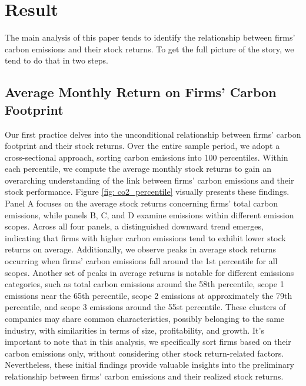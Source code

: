 \documentclass[12pt]{article}
\begin{document}
\section{Result} \label{sec:result}

The main analysis of this paper tends to identify the relationship between firms' carbon emissions and their stock returns. To get the full picture of the story, we tend to do that in two steps. 
\subsection{Average Monthly Return on Firms' Carbon Footprint}

Our first practice delves into the unconditional relationship between firms' carbon footprint and their stock returns. Over the entire sample period, we adopt a cross-sectional approach, sorting carbon emissions into 100 percentiles. Within each percentile, we compute the average monthly stock returns to gain an overarching understanding of the link between firms' carbon emissions and their stock performance. Figure \ref{fig: co2_percentile} visually presents these findings. Panel A focuses on the average stock returns concerning firms' total carbon emissions, while panels B, C, and D examine emissions within different emission scopes. Across all four panels, a distinguished downward trend emerges, indicating that firms with higher carbon emissions tend to exhibit lower stock returns on average. Additionally, we observe peaks in average stock returns occurring when firms' carbon emissions fall around the 1st percentile for all scopes. Another set of peaks in average returns is notable for different emissions categories, such as total carbon emissions around the 58th percentile, scope 1 emissions near the 65th percentile, scope 2 emissions at approximately the 79th percentile, and scope 3 emissions around the 55st percentile. These clusters of companies may share common characteristics, possibly belonging to the same industry, with similarities in terms of size, profitability, and growth. It's important to note that in this analysis, we specifically sort firms based on their carbon emissions only, without considering other stock return-related factors. Nevertheless, these initial findings provide valuable insights into the preliminary relationship between firms' carbon emissions and their realized stock returns.
\end{document}
